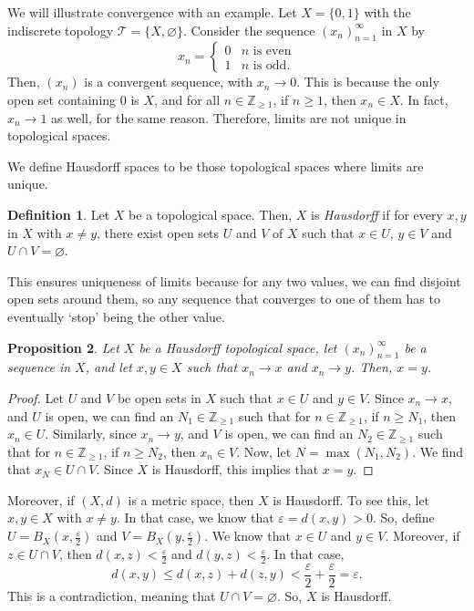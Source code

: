 \documentclass[a4paper, openany]{memoir}
\theoremstyle{definition}
\newtheorem{definition}{Definition}[section]
\theoremstyle{plain}
\newtheorem{proposition}[definition]{Proposition}
\begin{document}
We will illustrate convergence with an example. Let $X = \{0, 1\}$ with the indiscrete topology $\mathcal{T} = \{X, \varnothing\}$. Consider the sequence $(x_n)_{n=1}^{\infty}$ in $X$ by
\[x_n = \begin{cases}
0 & n \text{ is even} \\
1 & n \text{ is odd}.
\end{cases}\]
Then, $(x_n)$ is a convergent sequence, with $x_n \to 0$. This is because the only open set containing $0$ is $X$, and for all $n \in \mathbb{Z}_{\geqslant 1}$, if $n \geqslant 1$, then $x_n \in X$. In fact, $x_n \to 1$ as well, for the same reason. Therefore, limits are not unique in topological spaces.

We define Hausdorff spaces to be those topological spaces where limits are unique.
\begin{definition}
Let $X$ be a topological space. Then, $X$ is \emph{Hausdorff} if for every $x, y$ in $X$ with $x \neq y$, there exist open sets $U$ and $V$ of $X$ such that $x \in U$, $y \in V$ and $U \cap V = \varnothing$.
\end{definition}
\noindent This ensures uniqueness of limits because for any two values, we can find disjoint open sets around them, so any sequence that converges to one of them has to eventually `stop' being the other value.
\begin{proposition}
Let $X$ be a Hausdorff topological space, let $(x_n)_{n=1}^{\infty}$ be a sequence in $X$, and let $x, y \in X$ such that $x_n \to x$ and $x_n \to y$. Then, $x = y$.
\end{proposition}
\begin{proof}
Let $U$ and $V$ be open sets in $X$ such that $x \in U$ and $y \in V$. Since $x_n \to x$, and $U$ is open, we can find an $N_1 \in \mathbb{Z}_{\geqslant 1}$ such that for $n \in \mathbb{Z}_{\geqslant 1}$, if $n \geqslant N_1$, then $x_n \in U$. Similarly, since $x_n \to y$, and $V$ is open, we can find an $N_2 \in \mathbb{Z}_{\geqslant 1}$ such that for $n \in \mathbb{Z}_{\geqslant 1}$, if $n \geqslant N_2$, then $x_n \in V$. Now, let $N = \max(N_1, N_2)$. We find that $x_N \in U \cap V$. Since $X$ is Hausdorff, this implies that $x = y$.
\end{proof}

\noindent Moreover, if $(X, d)$ is a metric space, then $X$ is Hausdorff. To see this, let $x, y \in X$ with $x \neq y$. In that case, we know that $\varepsilon = d(x, y) > 0$. So, define $U = B_X(x, \frac{\varepsilon}{2})$ and $V = B_X(y, \frac{\varepsilon}{2})$. We know that $x \in U$ and $y \in V$. Moreover, if $z \in U \cap V$, then $d(x, z) < \frac{\varepsilon}{2}$ and $d(y, z) < \frac{\varepsilon}{2}$. In that case,
\[d(x, y) \leqslant d(x, z) + d(z, y) < \frac{\varepsilon}{2} + \frac{\varepsilon}{2} = \varepsilon.\]
This is a contradiction, meaning that $U \cap V = \varnothing$. So, $X$ is Hausdorff.
\end{document}
